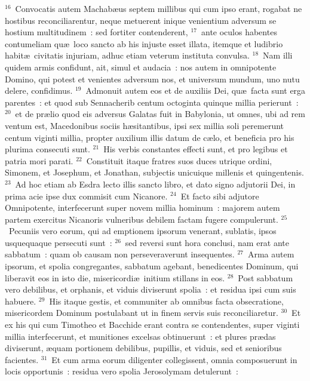 ${}^{16}$~Convocatis autem Machab\ae us septem millibus qui cum ipso erant, rogabat ne hostibus reconciliarentur, neque metuerent inique venientium adversum se hostium multitudinem~: sed fortiter contenderent,
${}^{17}$~ante oculos habentes contumeliam qu\ae\ loco sancto ab his injuste esset illata, itemque et ludibrio habit\ae\ civitatis injuriam, adhuc etiam veterum instituta convulsa.
${}^{18}$~Nam illi quidem armis confidunt, ait, simul et audacia~: nos autem in omnipotente Domino, qui potest et venientes adversum nos, et universum mundum, uno nutu delere, confidimus.
${}^{19}$~Admonuit autem eos et de auxiliis Dei, qu\ae\ facta sunt erga parentes~: et quod sub Sennacherib centum octoginta quinque millia perierunt~:
${}^{20}$~et de pr\ae lio quod eis adversus Galatas fuit in Babylonia, ut omnes, ubi ad rem ventum est, Macedonibus sociis h\ae sitantibus, ipsi sex millia soli peremerunt centum viginti millia, propter auxilium illis datum de c\ae lo, et beneficia pro his plurima consecuti sunt.
${}^{21}$~His verbis constantes effecti sunt, et pro legibus et patria mori parati.
${}^{22}$~Constituit itaque fratres suos duces utrique ordini, Simonem, et Josephum, et Jonathan, subjectis unicuique millenis et quingentenis.
${}^{23}$~Ad hoc etiam ab Esdra lecto illis sancto libro, et dato signo adjutorii Dei, in prima acie ipse dux commisit cum Nicanore.
${}^{24}$~Et facto sibi adjutore Omnipotente, interfecerunt super novem millia hominum~: majorem autem partem exercitus Nicanoris vulneribus debilem factam fugere compulerunt.
${}^{25}$~Pecuniis vero eorum, qui ad emptionem ipsorum venerant, sublatis, ipsos usquequaque persecuti sunt~:
${}^{26}$~sed reversi sunt hora conclusi, nam erat ante sabbatum~: quam ob causam non perseveraverunt insequentes.
${}^{27}$~Arma autem ipsorum, et spolia congregantes, sabbatum agebant, benedicentes Dominum, qui liberavit eos in isto die, misericordi\ae\ initium stillans in eos.
${}^{28}$~Post sabbatum vero debilibus, et orphanis, et viduis diviserunt spolia~: et residua ipsi cum suis habuere.
${}^{29}$~His itaque gestis, et communiter ab omnibus facta obsecratione, misericordem Dominum postulabant ut in finem servis suis reconciliaretur.
${}^{30}$~Et ex his qui cum Timotheo et Bacchide erant contra se contendentes, super viginti millia interfecerunt, et munitiones excelsas obtinuerunt~: et plures pr\ae das diviserunt, \ae quam portionem debilibus, pupillis, et viduis, sed et senioribus facientes.
${}^{31}$~Et cum arma eorum diligenter collegissent, omnia composuerunt in locis opportunis~: residua vero spolia Jerosolymam detulerunt~:
